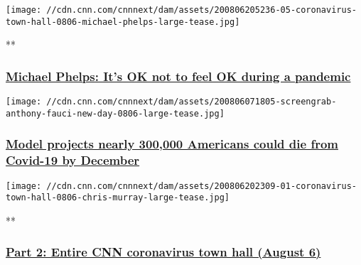 \href{/videos/health/2020/08/07/michael-phelps-mental-health-challenges-pandemic-town-hall-vpx.cnn}{}

\texttt{[image: //cdn.cnn.com/cnnnext/dam/assets/200806205236-05-coronavirus-town-hall-0806-michael-phelps-large-tease.jpg]}

**

\hypertarget{michael-phelps-its-ok-not-to-feel-ok-during-a-pandemic}{%
\subsubsection{\texorpdfstring{\href{/videos/health/2020/08/07/michael-phelps-mental-health-challenges-pandemic-town-hall-vpx.cnn}{Michael
Phelps: It's OK not to feel OK during a
pandemic}}{Michael Phelps: It's OK not to feel OK during a pandemic}}\label{michael-phelps-its-ok-not-to-feel-ok-during-a-pandemic}}

\href{/2020/08/06/health/us-coronavirus-thursday/index.html}{}

\texttt{[image: //cdn.cnn.com/cnnnext/dam/assets/200806071805-screengrab-anthony-fauci-new-day-0806-large-tease.jpg]}

\hypertarget{model-projects-nearly-300000-americans-could-die-from-covid-19-by-december-1}{%
\subsubsection{\texorpdfstring{\href{/2020/08/06/health/us-coronavirus-thursday/index.html}{Model
projects nearly 300,000 Americans could die from Covid-19 by
December}}{Model projects nearly 300,000 Americans could die from Covid-19 by December}}\label{model-projects-nearly-300000-americans-could-die-from-covid-19-by-december-1}}

\href{/videos/health/2020/08/06/entire-august-6-coronavirus-town-hall-part-2-sot-vpx.cnn}{}

\texttt{[image: //cdn.cnn.com/cnnnext/dam/assets/200806202309-01-coronavirus-town-hall-0806-chris-murray-large-tease.jpg]}

**

\hypertarget{part-2-entire-cnn-coronavirus-town-hall-august-6}{%
\subsubsection{\texorpdfstring{\href{/videos/health/2020/08/06/entire-august-6-coronavirus-town-hall-part-2-sot-vpx.cnn}{Part
2: Entire CNN coronavirus town hall (August
6)}}{Part 2: Entire CNN coronavirus town hall (August 6)}}\label{part-2-entire-cnn-coronavirus-town-hall-august-6}}

